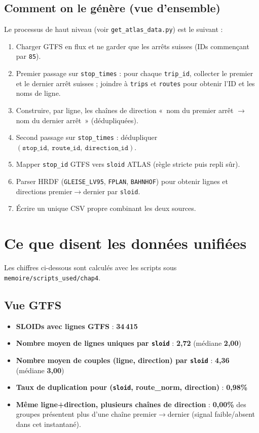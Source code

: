 \subsection{Comment on le génère (vue d'ensemble)}
Le processus de haut niveau (voir \texttt{get\_atlas\_data.py}) est le suivant :
\begin{enumerate}
  \item Charger GTFS en flux et ne garder que les arrêts suisses (IDs commençant par \texttt{85}).
  \item Premier passage sur \texttt{stop\_times} : pour chaque \texttt{trip\_id}, collecter le premier et le dernier arrêt suisses ; joindre à \texttt{trips} et \texttt{routes} pour obtenir l'ID et les noms de ligne.
  \item Construire, par ligne, les chaînes de direction « nom du premier arrêt $\rightarrow$ nom du dernier arrêt » (dédupliquées).
  \item Second passage sur \texttt{stop\_times} : dédupliquer \((\texttt{stop\_id},\ \texttt{route\_id},\ \texttt{direction\_id})\).
  \item Mapper \texttt{stop\_id} GTFS vers \texttt{sloid} ATLAS (règle stricte puis repli sûr).
  \item Parser HRDF (\texttt{GLEISE\_LV95}, \texttt{FPLAN}, \texttt{BAHNHOF}) pour obtenir lignes et directions premier$\rightarrow$dernier par \texttt{sloid}.
  \item Écrire un unique CSV propre combinant les deux sources.
\end{enumerate}

\section{Ce que disent les données unifiées}
Les chiffres ci-dessous sont calculés avec les scripts sous \texttt{memoire/scripts\_used/chap4}.

\subsection*{Vue GTFS}
\begin{itemize}
  \item \textbf{SLOIDs avec lignes GTFS} : \textbf{34\,415}
  \item \textbf{Nombre moyen de lignes uniques par \texttt{sloid}} : \textbf{2,72} (médiane \textbf{2,00})
  \item \textbf{Nombre moyen de couples (ligne, direction) par \texttt{sloid}} : \textbf{4,36} (médiane \textbf{3,00})
  \item \textbf{Taux de duplication pour (\texttt{sloid}, route\_norm, direction)} : \textbf{0,98\%}
  \item \textbf{Même ligne+direction, plusieurs chaînes de direction} : \textbf{0,00\%} des groupes présentent plus d'une chaîne premier$\rightarrow$dernier (signal faible/absent dans cet instantané).
\end{itemize}

